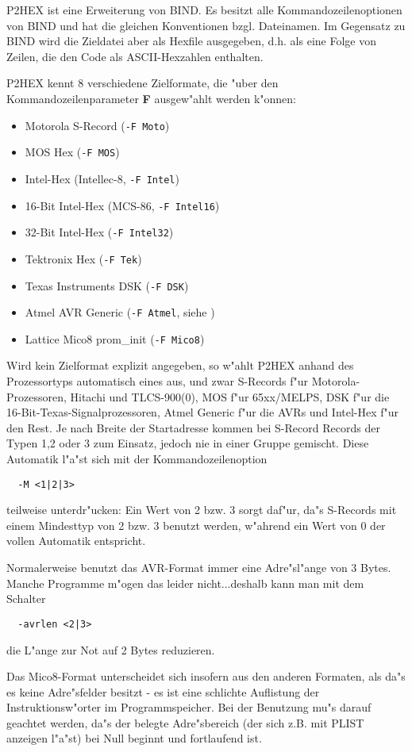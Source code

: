 \documentclass[12pt,a4paper,twoside]{report}
\newcommand{\bb}[1]{{\bf #1}}
\newcommand{\tty}[1]{{\tt #1}}
\begin{document}
P2HEX ist eine Erweiterung von BIND.  Es besitzt alle
Kommandozeilenoptionen von BIND und hat die gleichen Konventionen
bzgl. Dateinamen.  Im Gegensatz zu BIND wird die Zieldatei aber als
Hexfile ausgegeben, d.h. als eine Folge von Zeilen, die den Code als
ASCII-Hexzahlen enthalten.
\par
P2HEX kennt 8 verschiedene Zielformate, die "uber den
Kommandozeilenparameter \bb{F} ausgew"ahlt werden k"onnen:
\begin{itemize}
\item{Motorola S-Record (\tty{-F Moto})}
\item{MOS Hex (\tty{-F MOS})}
\item{Intel-Hex (Intellec-8, \tty{-F Intel})}
\item{16-Bit Intel-Hex (MCS-86, \tty{-F Intel16})}
\item{32-Bit Intel-Hex (\tty{-F Intel32})}
\item{Tektronix Hex (\tty{-F Tek})}
\item{Texas Instruments DSK (\tty{-F DSK})}
\item{Atmel AVR Generic (\tty{-F Atmel}, siehe \cite{AVRObj})}
\item{Lattice Mico8 prom\_init (\tty{-F Mico8})}
\end{itemize}
Wird kein Zielformat explizit angegeben, so w"ahlt P2HEX anhand des
Prozessortyps automatisch eines aus, und zwar S-Records f"ur Motorola-
Prozessoren, Hitachi und TLCS-900(0), MOS f"ur 65xx/MELPS, DSK f"ur die
16-Bit-Texas-Signalprozessoren, Atmel Generic f"ur die AVRs und Intel-Hex
f"ur den Rest. Je nach Breite der Startadresse kommen bei S-Record Records
der Typen 1,2 oder 3 zum Einsatz, jedoch nie in einer Gruppe gemischt.
Diese Automatik l"a"st sich mit der Kommandozeilenoption
\begin{verbatim}
  -M <1|2|3>
\end{verbatim}
teilweise unterdr"ucken: Ein Wert von 2 bzw. 3 sorgt daf"ur, da"s
S-Records mit einem Mindesttyp von 2 bzw. 3 benutzt werden, w"ahrend ein
Wert von 0 der vollen Automatik entspricht.

Normalerweise benutzt das AVR-Format immer eine Adre"sl"ange von 3 Bytes.
Manche Programme m"ogen das leider nicht...deshalb kann man mit dem
Schalter
\begin{verbatim}
  -avrlen <2|3>
\end{verbatim}
die L"ange zur Not auf 2 Bytes reduzieren.

Das Mico8-Format unterscheidet sich insofern aus den anderen
Formaten, als da"s es keine Adre"sfelder besitzt - es ist eine
schlichte Auflistung der Instruktionsw"orter im Programmspeicher.
Bei der Benutzung mu"s darauf geachtet werden, da"s der
belegte Adre"sbereich (der sich z.B. mit PLIST anzeigen l"a"st)
bei Null beginnt und fortlaufend ist.
\end{document}
